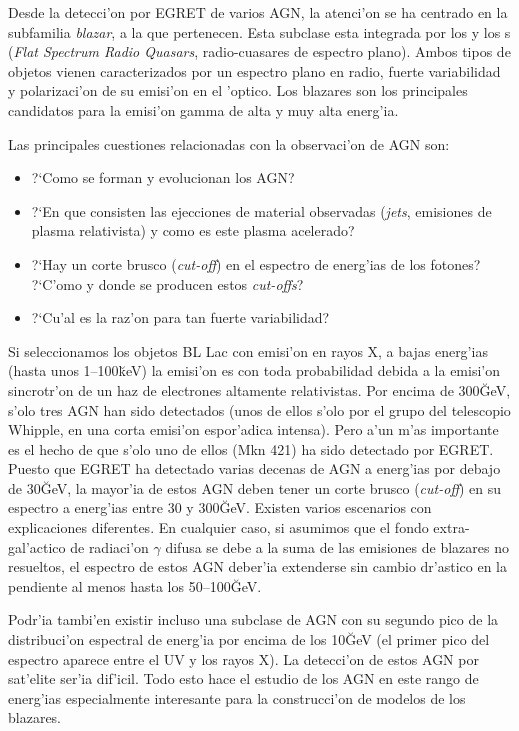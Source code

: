 
Desde la detecci'on por EGRET de varios AGN, la atenci'on se ha
centrado en la subfamilia \emph{blazar}, a la que pertenecen.  Esta
subclase esta integrada por los \emph{} y los
s (\emph{Flat Spectrum Radio Quasars}, radio-cuasares de
espectro plano). Ambos tipos de objetos vienen caracterizados por un
espectro plano en radio, fuerte variabilidad y polarizaci'on de su
emisi'on en el 'optico. Los blazares son los principales candidatos
para la emisi'on gamma de alta y muy alta energ'ia.

Las principales cuestiones relacionadas con la observaci'on de AGN
son:
%
\begin{itemize}
\item ?`Como se forman y evolucionan los AGN?
\item ?`En que consisten las ejecciones de material observadas
  (\emph{jets}, emisiones de plasma relativista) y como es este plasma
  acelerado?
\item ?`Hay un corte brusco (\emph{cut-off}) en el espectro de
  energ'ias de los fotones? ?`C'omo y donde se producen estos
  \emph{cut-offs}?
\item ?`Cu'al es la raz'on para tan fuerte variabilidad?
\end{itemize}

Si seleccionamos los objetos BL Lac con emisi'on en rayos X, a bajas
energ'ias (hasta unos 1--100\u{keV}) la emisi'on es con toda
probabilidad debida a la emisi'on sincrotr'on de un haz de electrones
altamente relativistas. Por encima de 300\u{GeV}, s'olo tres AGN han
sido detectados (unos de ellos s'olo por el grupo del telescopio
Whipple, en una corta emisi'on espor'adica intensa). Pero a'un m'as
importante es el hecho de que s'olo uno de ellos (Mkn 421) ha sido
detectado por EGRET. Puesto que EGRET ha detectado varias decenas de
AGN a energ'ias por debajo de 30\u{GeV}, la mayor'ia de estos AGN
deben tener un corte brusco (\emph{cut-off}) en su espectro a
energ'ias entre 30 y 300\u{GeV}. Existen varios escenarios con
explicaciones diferentes.  En cualquier caso, si asumimos que el fondo
extra-gal'actico de radiaci'on $\gamma$ difusa se debe a la suma de
las emisiones de blazares no resueltos, el espectro de estos AGN
deber'ia extenderse sin cambio dr'astico en la pendiente al menos
hasta los 50--100\u{GeV}.

Podr'ia tambi'en existir incluso una subclase de AGN con su segundo
pico de la distribuci'on espectral de energ'ia por encima de los
10\u{GeV} (el primer pico del espectro aparece entre el UV y los rayos
X). La detecci'on de estos AGN por sat'elite ser'ia dif'icil. Todo
esto hace el estudio de los AGN en este rango de energ'ias
especialmente interesante para la construcci'on de modelos de los
blazares.

